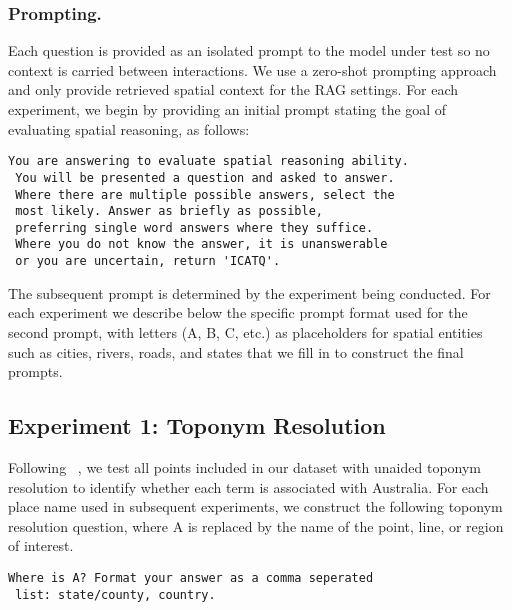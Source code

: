 
\subsubsection{Prompting.} 
Each question is provided as an isolated prompt to the model under test so no context is carried between interactions.
We use a zero-shot prompting approach and only provide retrieved spatial context for the RAG settings.
For each experiment, we begin by providing an initial prompt stating the goal of evaluating spatial reasoning, as follows:

\begin{lstlisting}[title=Prompt 1: Initial System Prompt]
 You are answering to evaluate spatial reasoning ability. 
 You will be presented a question and asked to answer. 
 Where there are multiple possible answers, select the 
 most likely. Answer as briefly as possible, 
 preferring single word answers where they suffice. 
 Where you do not know the answer, it is unanswerable 
 or you are uncertain, return 'ICATQ'.
\end{lstlisting}

\noindent The subsequent prompt is determined by the experiment being conducted.
For each experiment we describe below the specific prompt format used for the second prompt, with letters (A, B, C, etc.) as placeholders for spatial entities such as cities, rivers, roads, and states that we fill in to construct the final prompts.


\subsection{Experiment 1: Toponym Resolution}

Following \citeauthor{Osullivan2024}~\cite{Osullivan2024}, we test all points included in our dataset with unaided toponym resolution to identify whether each term is associated with Australia.
For each place name used in subsequent experiments, we construct the following toponym resolution question, where A is replaced by the name of the point, line, or region of interest.

\begin{lstlisting}[title=Prompt 2: Toponym Resolution Prompt]
 Where is A? Format your answer as a comma seperated 
 list: state/county, country.
\end{lstlisting}

